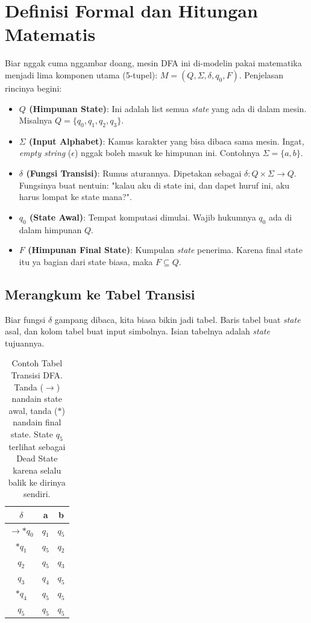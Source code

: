 \documentclass[12pt,a4paper]{article}
\begin{document}
\newpage
\section{Definisi Formal dan Hitungan Matematis}

Biar nggak cuma nggambar doang, mesin DFA ini di-modelin pakai matematika menjadi lima komponen utama (5-tupel): $M = (Q, \Sigma, \delta, q_0, F)$.
Penjelasan rincinya begini:
\begin{itemize}
    \item \textbf{$Q$ (Himpunan State)}: Ini adalah list semua \textit{state} yang ada di dalam mesin. Misalnya $Q = \{q_0, q_1, q_2, q_3\}$.
    \item \textbf{$\Sigma$ (Input Alphabet)}: Kamus karakter yang bisa dibaca sama mesin. Ingat, \textit{empty string} ($\epsilon$) nggak boleh masuk ke himpunan ini. Contohnya $\Sigma = \{a, b\}$.
    \item \textbf{$\delta$ (Fungsi Transisi)}: Rumus aturannya. Dipetakan sebagai $\delta : Q \times \Sigma \rightarrow Q$. Fungsinya buat nentuin: "kalau aku di state ini, dan dapet huruf ini, aku harus lompat ke state mana?".
    \item \textbf{$q_0$ (State Awal)}: Tempat komputasi dimulai. Wajib hukumnya $q_0$ ada di dalam himpunan $Q$.
    \item \textbf{$F$ (Himpunan Final State)}: Kumpulan \textit{state} penerima. Karena final state itu ya bagian dari state biasa, maka $F \subseteq Q$.
\end{itemize}

\subsection{Merangkum ke Tabel Transisi}
Biar fungsi $\delta$ gampang dibaca, kita biasa bikin jadi tabel. Baris tabel buat \textit{state} asal, dan kolom tabel buat input simbolnya. Isian tabelnya adalah \textit{state} tujuannya.

\begin{table}[h]
\centering
\begin{tabular}{@{}ccc@{}}
\toprule
\textbf{$\delta$} & \textbf{a} & \textbf{b} \\ \midrule
$\rightarrow *q_0$ & $q_1$ & $q_5$ \\
$*q_1$ & $q_5$ & $q_2$ \\
$q_2$ & $q_5$ & $q_3$ \\
$q_3$ & $q_4$ & $q_5$ \\
$*q_4$ & $q_5$ & $q_5$ \\
$q_5$ & $q_5$ & $q_5$ \\ \bottomrule
\end{tabular}
\caption{Contoh Tabel Transisi DFA. Tanda ($\rightarrow$) nandain state awal, tanda ($*$) nandain final state. State $q_5$ terlihat sebagai Dead State karena selalu balik ke dirinya sendiri.}
\end{table}
\end{document}

